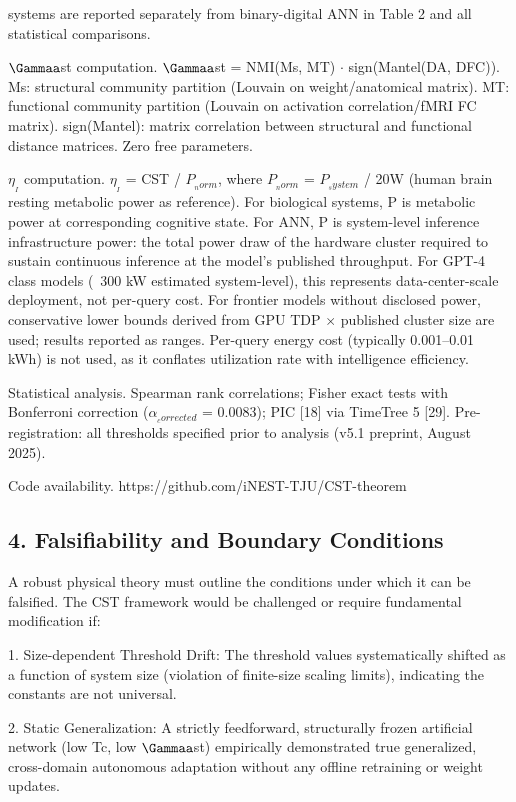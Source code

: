 \documentclass[a4paper,12pt]{article}
\begin{document}
\dagNMH systems are reported separately from binary-digital ANN in Table 2 and all statistical comparisons.


$\Gammaa$st computation. $\Gammaa$st = NMI(Ms, MT) $\cdot$ sign(Mantel(DA, DFC)). Ms: structural community partition (Louvain on weight/anatomical matrix). MT: functional community partition (Louvain on activation correlation/fMRI FC matrix). sign(Mantel): matrix correlation between structural and functional distance matrices. Zero free parameters.


$\eta_{_I}$ computation. $\eta_{_I}$ = CST / $P_{_norm}$, where $P_{_norm}$ = $P_{_system}$ / 20W (human brain resting metabolic power as reference). For biological systems, P is metabolic power at corresponding cognitive state. For ANN, P is system-level inference infrastructure power: the total power draw of the hardware cluster required to sustain continuous inference at the model's published throughput. For GPT-4 class models (~300 kW estimated system-level), this represents data-center-scale deployment, not per-query cost. For frontier models without disclosed power, conservative lower bounds derived from GPU TDP $\times$ published cluster size are used; results reported as ranges. Per-query energy cost (typically 0.001--0.01 kWh) is not used, as it conflates utilization rate with intelligence efficiency.


Statistical analysis. Spearman rank correlations; Fisher exact tests with Bonferroni correction ($\alpha_{_corrected}$ = 0.0083); PIC [18] via TimeTree 5 [29]. Pre-registration: all thresholds specified prior to analysis (v5.1 preprint, August 2025).


Code availability. https://github.com/iNEST-TJU/CST-theorem



\subsection{4. Falsifiability and Boundary Conditions}

A robust physical theory must outline the conditions under which it can be falsified. The CST framework would be challenged or require fundamental modification if:


1. Size-dependent Threshold Drift: The threshold values systematically shifted as a function of system size (violation of finite-size scaling limits), indicating the constants are not universal.


2. Static Generalization: A strictly feedforward, structurally frozen artificial network (low Tc, low $\Gammaa$st) empirically demonstrated true generalized, cross-domain autonomous adaptation without any offline retraining or weight updates.
\end{document}
